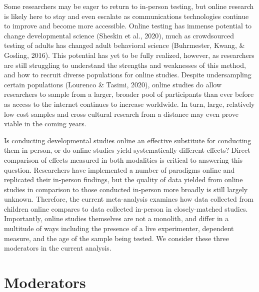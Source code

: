 \documentclass[
  man,floatsintext]{apa6}
\begin{document}
Some researchers may be eager to return to in-person testing, but online research is likely here to stay and even escalate as communications technologies continue to improve and become more accessible. Online testing has immense potential to change developmental science (Sheskin et al., 2020), much as crowdsourced testing of adults has changed adult behavioral science (Buhrmester, Kwang, \& Gosling, 2016). This potential has yet to be fully realized, however, as researchers are still struggling to understand the strengths and weaknesses of this method, and how to recruit diverse populations for online studies. Despite undersampling certain populations (Lourenco \& Tasimi, 2020), online studies do allow researchers to sample from a larger, broader pool of participants than ever before as access to the internet continues to increase worldwide. In turn, large, relatively low cost samples and cross cultural research from a distance may even prove viable in the coming years.

Is conducting developmental studies online an effective substitute for conducting them in-person, or do online studies yield systematically different effects? Direct comparison of effects measured in both modalities is critical to answering this question. Researchers have implemented a number of paradigms online and replicated their in-person findings, but the quality of data yielded from online studies in comparison to those conducted in-person more broadly is still largely unknown. Therefore, the current meta-analysis examines how data collected from children online compares to data collected in-person in closely-matched studies. Importantly, online studies themselves are not a monolith, and differ in a multitude of ways including the presence of a live experimenter, dependent measure, and the age of the sample being tested. We consider these three moderators in the current analysis.

\hypertarget{moderators}{%
\section{Moderators}\label{moderators}}
\end{document}
